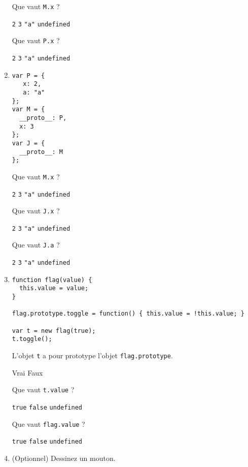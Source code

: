 \documentclass[a4paper, 12pt]{article}
\newcommand{\choice}[1]{\Square\hspace{2pt} #1\hspace{5pt}}
\newcommand{\choicec}[1]{\Square\hspace{2pt} \lstinline{#1}\hspace{5pt}}
\begin{document}
\begin{enumerate}
  Que vaut \lstinline{M.x} ?

  \choicec{2} \choicec{3} \choicec{"a"} \choicec{undefined}

  Que vaut \lstinline{P.x} ?

  \choicec{2} \choicec{3} \choicec{"a"} \choicec{undefined}
\item \lstset{language=javascript}
\begin{lstlisting}
var P = {
   x: 2,
   a: "a"
};
var M = {
  __proto__: P,
  x: 3
};
var J = {
  __proto__: M
};
\end{lstlisting}

  Que vaut \lstinline{M.x} ?

  \choicec{2} \choicec{3} \choicec{"a"} \choicec{undefined}

  Que vaut \lstinline{J.x} ?

  \choicec{2} \choicec{3} \choicec{"a"} \choicec{undefined}

  Que vaut \lstinline{J.a} ?

  \choicec{2} \choicec{3} \choicec{"a"} \choicec{undefined}
\item \lstset{language=javascript}
\begin{lstlisting}
function flag(value) {
  this.value = value;
}

flag.prototype.toggle = function() { this.value = !this.value; }

var t = new flag(true);
t.toggle();
\end{lstlisting}

  L'objet \lstinline{t} a pour prototype l'objet
  \lstinline{flag.prototype}.

  \choice{Vrai} \choice{Faux}

  Que vaut \lstinline{t.value} ?

  \choicec{true} \choicec{false} \choicec{undefined}

  Que vaut \lstinline{flag.value} ?

  \choicec{true} \choicec{false} \choicec{undefined}
\item (Optionnel) Dessinez un mouton.
\end{enumerate}
\end{document}
